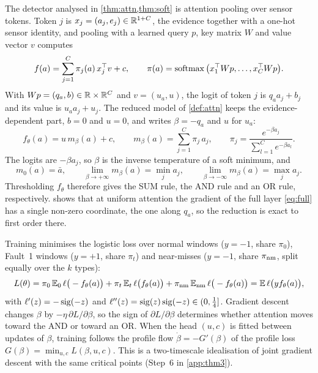 The detector analysed in \cref{thm:attn,thm:soft} is attention pooling over sensor tokens. Token $j$ is $x_j=(a_j,e_j)\in\mathbb{R}^{1+C}$, the evidence together with a one-hot sensor identity, and pooling with a learned query $p$, key matrix $W$ and value vector $v$ computes
\begin{equation}\label{eq:full}
  f(a)=\sum_{j=1}^C\pi_j(a)\,x_j^\top v+c,
  \qquad
  \pi(a)=\operatorname{softmax}\big(x_1^\top Wp,\dots,x_C^\top Wp\big).
\end{equation}
With $Wp=(q_a,b)\in\mathbb{R}\times\mathbb{R}^C$ and $v=(u_a,u)$, the logit of token $j$ is $q_aa_j+b_j$ and its value is $u_aa_j+u_j$. The reduced model of \cref{def:attn} keeps the evidence-dependent part, $b=0$ and $u=0$, and writes $\beta=-q_a$ and $u$ for $u_a$:
\begin{equation}\label{eq:reduced}
  f_\theta(a)=u\,m_\beta(a)+c,
  \qquad
  m_\beta(a)=\sum_{j=1}^C\pi_j\,a_j,
  \qquad
  \pi_j=\frac{e^{-\beta a_j}}{\sum_{l=1}^Ce^{-\beta a_l}} .
\end{equation}
The logits are $-\beta a_j$, so $\beta$ is the inverse temperature of a soft minimum, and
\begin{equation}\label{eq:limits}
  m_0(a)=\bar a,
  \qquad
  \lim_{\beta\to+\infty}m_\beta(a)=\min_ja_j,
  \qquad
  \lim_{\beta\to-\infty}m_\beta(a)=\max_ja_j .
\end{equation}
Thresholding $f_\theta$ therefore gives the SUM rule, the AND rule and an OR rule, respectively.  shows that at uniform attention the gradient of the full layer \cref{eq:full} has a single non-zero coordinate, the one along $q_a$, so the reduction is exact to first order there.

Training minimises the logistic loss over normal windows ($y=-1$, share $\pi_0$), Fault~1 windows ($y=+1$, share $\pi_t$) and near-misses ($y=-1$, share $\pi_{\mathrm{nm}}$, split equally over the $k$ types):
\begin{equation}\label{eq:loss}
  L(\theta)=\pi_0\,\mathbb{E}_0\,\ell\big(-f_\theta(a)\big)+\pi_t\,\mathbb{E}_t\,\ell\big(f_\theta(a)\big)+\pi_{\mathrm{nm}}\,\mathbb{E}_{\mathrm{nm}}\,\ell\big(-f_\theta(a)\big)=\mathbb{E}\,\ell\big(yf_\theta(a)\big),
\end{equation}
with $\ell'(z)=-\operatorname{sig}(-z)$ and $\ell''(z)=\operatorname{sig}(z)\operatorname{sig}(-z)\in(0,\tfrac14]$. Gradient descent changes $\beta$ by $-\eta\,\partial L/\partial\beta$, so the sign of $\partial L/\partial\beta$ determines whether attention moves toward the AND or toward an OR. When the head $(u,c)$ is fitted between updates of $\beta$, training follows the profile flow $\dot\beta=-G'(\beta)$ of the profile loss $G(\beta)=\min_{u,c}L(\beta,u,c)$. This is a two-timescale idealisation of joint gradient descent with the same critical points (Step~6 in \cref{app:thm3}).

